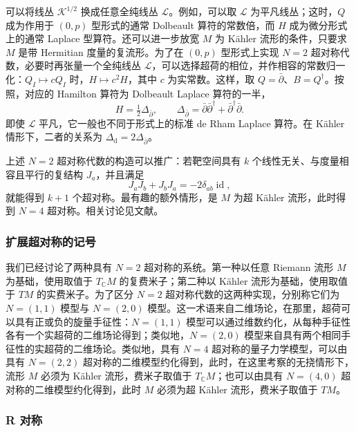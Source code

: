 可以将线丛 $\mathcal{K}^{1/2}$ 换成任意全纯线丛 $\mathcal{L}$。例如，可以取 $\mathcal{L}$ 为平凡线丛；这时，$Q$ 成为作用于 $(0,p)$ 型形式的通常 Dolbeault 算符的常数倍，而 $H$ 成为微分形式上的通常 Laplace 型算符。还可以进一步放宽 $M$ 为 Kähler 流形的条件，只要求 $M$ 是带 Hermitian 度量的复流形。为了在 $(0,p)$ 型形式上实现 $N=2$ 超对称代数，必要时再张量一个全纯线丛 $\mathcal{L}$，可以选择超荷的相位，并作相容的常数归一化：$Q_I\mapsto cQ_I$ 时，$H\mapsto c^2H$，其中 $c$ 为实常数。这样，取 $Q=\bar\partial$、$B=Q^\dagger$。按照，对应的 Hamilton 算符为 Dolbeault Laplace 算符的一半，
\[
H=\tfrac12\Delta_{\bar\partial},\qquad
\Delta_{\bar\partial}=\bar\partial\bar\partial^\dagger
+\bar\partial^\dagger\bar\partial.
\]
即使 $\mathcal{L}$ 平凡，它一般也不同于形式上的标准 de Rham Laplace 算符。在 Kähler 情形下，二者的关系为 $\Delta_{\mathrm{d}}=2\Delta_{\bar\partial}$。

上述 $N=2$ 超对称代数的构造可以推广：若靶空间具有 $k$ 个线性无关、与度量相容且平行的复结构 $J_a$，并且满足
\[
J_aJ_b+J_bJ_a=-2\delta_{ab}\operatorname{id},
\]
就能得到 $k+1$ 个超对称。最有趣的额外情形，是 $M$ 为超 Kähler 流形，此时得到 $N=4$ 超对称。相关讨论见文献。

\subsubsection{扩展超对称的记号}\label{sec:3.1.4.1}

我们已经讨论了两种具有 $N=2$ 超对称的系统。第一种以任意 Riemann 流形 $M$ 为基础，使用取值于 $T_\mathbb{C}M$ 的复费米子；第二种以 Kähler 流形为基础，使用取值于 $TM$ 的实费米子。为了区分 $N=2$ 超对称代数的这两种实现，分别称它们为 $N=(1,1)$ 模型与 $N=(2,0)$ 模型。这一术语来自二维场论，在那里，超荷可以具有正或负的旋量手征性：$N=(1,1)$ 模型可以通过维数约化，从每种手征性各有一个实超荷的二维场论得到；类似地，$N=(2,0)$ 模型来自具有两个相同手征性的实超荷的二维场论。类似地，具有 $N=4$ 超对称的量子力学模型，可以由具有 $N=(2,2)$ 超对称的二维模型约化得到，此时，在这里考察的无挠情形下，流形 $M$ 必须为 Kähler 流形，费米子取值于 $T_\mathbb{C}M$；也可以由具有 $N=(4,0)$ 超对称的二维模型约化得到，此时 $M$ 必须为超 Kähler 流形，费米子取值于 $TM$。

\subsubsection{R 对称}\label{sec:3.1.4.2}

